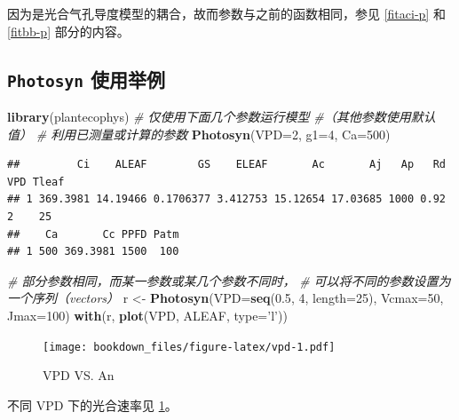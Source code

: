 \documentclass[
]{krantz}
\makeatletter
\newenvironment{Shaded}{\begin{snugshade}}{\end{snugshade}}
\newcommand{\CommentTok}[1]{\textcolor[rgb]{0.56,0.35,0.01}{\textit{#1}}}
\newcommand{\DataTypeTok}[1]{\textcolor[rgb]{0.13,0.29,0.53}{#1}}
\newcommand{\DecValTok}[1]{\textcolor[rgb]{0.00,0.00,0.81}{#1}}
\newcommand{\FloatTok}[1]{\textcolor[rgb]{0.00,0.00,0.81}{#1}}
\newcommand{\KeywordTok}[1]{\textcolor[rgb]{0.13,0.29,0.53}{\textbf{#1}}}
\newcommand{\NormalTok}[1]{#1}
\newcommand{\StringTok}[1]{\textcolor[rgb]{0.31,0.60,0.02}{#1}}
\newenvironment{kframe}{%
\medskip{}
\setlength{\fboxsep}{.8em}
 \def\at@end@of@kframe{}%
 \ifinner\ifhmode%
  \def\at@end@of@kframe{\end{minipage}}%
  \begin{minipage}{\columnwidth}%
 \fi\fi%
 \def\FrameCommand##1{\hskip\@totalleftmargin \hskip-\fboxsep
 \colorbox{shadecolor}{##1}\hskip-\fboxsep
     \hskip-\linewidth \hskip-\@totalleftmargin \hskip\columnwidth}%
 \MakeFramed {\advance\hsize-\width
   \@totalleftmargin\z@ \linewidth\hsize
   \@setminipage}}%
 {\par\unskip\endMakeFramed%
 \at@end@of@kframe}
\renewenvironment{Shaded}{\begin{kframe}}{\end{kframe}}
\makeatother
\begin{document}
因为是光合气孔导度模型的耦合，故而参数与之前的函数相同，参见 \ref{fitaci-p} 和 \ref{fitbb-p} 部分的内容。

\hypertarget{photo_exam}{%
\subsection{\texorpdfstring{\texttt{Photosyn} 使用举例}{Photosyn 使用举例}}\label{photo_exam}}

\begin{Shaded}
\begin{Highlighting}[]
\KeywordTok{library}\NormalTok{(plantecophys)}
\CommentTok{# 仅使用下面几个参数运行模型}
\CommentTok{#（其他参数使用默认值）}
\CommentTok{# 利用已测量或计算的参数}
\KeywordTok{Photosyn}\NormalTok{(}\DataTypeTok{VPD=}\DecValTok{2}\NormalTok{, }\DataTypeTok{g1=}\DecValTok{4}\NormalTok{, }\DataTypeTok{Ca=}\DecValTok{500}\NormalTok{)}
\end{Highlighting}
\end{Shaded}

\begin{verbatim}
##         Ci    ALEAF        GS    ELEAF       Ac       Aj   Ap   Rd VPD Tleaf
## 1 369.3981 14.19466 0.1706377 3.412753 15.12654 17.03685 1000 0.92   2    25
##    Ca       Cc PPFD Patm
## 1 500 369.3981 1500  100
\end{verbatim}

\begin{Shaded}
\begin{Highlighting}[]
\CommentTok{# 部分参数相同，而某一参数或某几个参数不同时，}
\CommentTok{# 可以将不同的参数设置为一个序列（vectors）}
\NormalTok{r <-}\StringTok{ }\KeywordTok{Photosyn}\NormalTok{(}\DataTypeTok{VPD=}\KeywordTok{seq}\NormalTok{(}\FloatTok{0.5}\NormalTok{, }\DecValTok{4}\NormalTok{, }\DataTypeTok{length=}\DecValTok{25}\NormalTok{), }
              \DataTypeTok{Vcmax=}\DecValTok{50}\NormalTok{, }\DataTypeTok{Jmax=}\DecValTok{100}\NormalTok{)}
\KeywordTok{with}\NormalTok{(r, }\KeywordTok{plot}\NormalTok{(VPD, ALEAF, }\DataTypeTok{type=}\StringTok{'l'}\NormalTok{))}
\end{Highlighting}
\end{Shaded}

\begin{figure}
\centering
\texttt{[image: bookdown\_files/figure-latex/vpd-1.pdf]}
\caption{\label{fig:vpd}VPD VS. An}
\end{figure}

不同 VPD 下的光合速率见 \ref{fig:vpd}。
\end{document}
